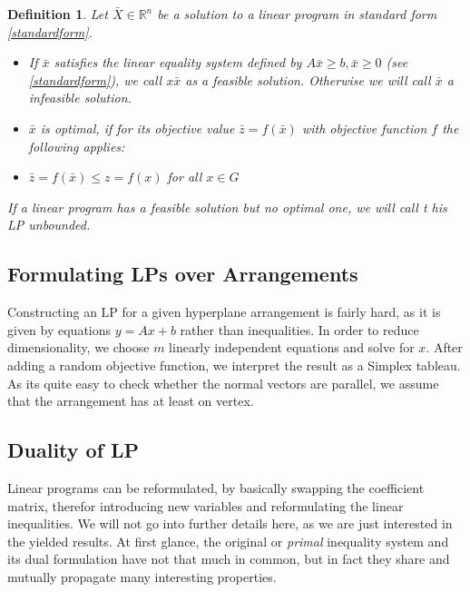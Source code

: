 \documentclass[a4paper, 11pt]{article}
\makeatletter
\newtheorem{mydef}{Definition}
\renewenvironment{quotation}
{\list{}{\listparindent=1.5em
		\itemindent=0pt
		\parsep\z@ \@plus\p@}%
	\item\relax}
{\endlist}
\makeatother
\begin{document}
\begin{mydef}
	Let $\bar{X} \in \mathbb{R}^n$ be a solution to a linear program in standard form \ref{standardform}.\\
	\begin{itemize}
		\item[(1)] If $\bar{x}$ satisfies the linear equality system defined by $A\bar{x}\geq b, \bar{x}\geq 0$ (see \ref{standardform}), we call $x\bar{x}$ as a \emph{feasible solution}. Otherwise we will call $\bar{x}$ a infeasible solution.
		\item[(2)] $\bar{x}$ is \emph{optimal}, if for its objective value $\bar{z} = f(\bar{x})$ with objective function $f$ the following applies:
		\begin{quotation}
			$\bar{z} = f(\bar{x}) \leq z = f(x)$ for all $x\in G$
		\end{quotation}
	\end{itemize}
	If a linear program has a feasible solution but no optimal one, we will call t his LP unbounded.
\end{mydef}

\subsection{Formulating LPs over Arrangements}
Constructing an LP for a given hyperplane arrangement is fairly hard, as it is given by equations $y=Ax + b$ rather than inequalities. In order to reduce dimensionality, we choose $m$ linearly independent equations and solve for $x$. After adding a random objective function, we interpret the result as a Simplex tableau. As its quite easy to check whether the normal vectors are parallel, we assume that the arrangement has at least on vertex.


\subsection{Duality of LP}
Linear programs can be reformulated, by basically \glqq swapping\grqq{} the coefficient matrix, therefor introducing new variables and reformulating the linear inequalities. We will not go into further details here, as we are just interested in the yielded results. At first glance, the original or \textit{primal} inequality system and its dual formulation have not that much in common, but in fact they share and mutually propagate many interesting properties. \\
\end{document}
